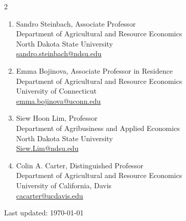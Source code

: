 \documentclass[10.5pt,letterpaper]{article}
\begin{document}
	\begin{multicols}{2}
		\begin{enumerate}[leftmargin=0in]
			
			\item[] Sandro Steinbach, Associate Professor \\
			Department of Agricultural and Resource Economics \\
			North Dakota State University \\
			\href{mailto:sandro.steinbach@ndsu.edu}{sandro.steinbach@ndsu.edu}
			
			\item[] Emma Bojinova, Associate Professor in Residence \\
			Department of Agricultural and Resource Economics \\
			University of Connecticut \\
			\href{mailto:emma.bojinova@uconn.edu}{emma.bojinova@uconn.edu}
			
			\item[] Siew Hoon Lim, Professor \\
			Department of Agribusiness and Applied Economics \\
			North Dakota State University \\
			\href{mailto:Siew.Lim@ndsu.edu}{Siew.Lim@ndsu.edu}
			
			\item[] Colin A. Carter, Distinguished Professor \\
			Department of Agricultural and Resource Economics \\
			University of California, Davis \\
			\href{mailto:cacarter@ucdavis.edu}{cacarter@ucdavis.edu}
			
		\end{enumerate}
	\end{multicols}
	
	
	\vfill
	\begin{center}
		\begin{footnotesize}
			\raggedleft Last updated: \today
		\end{footnotesize}
	\end{center}
	
\end{document}
